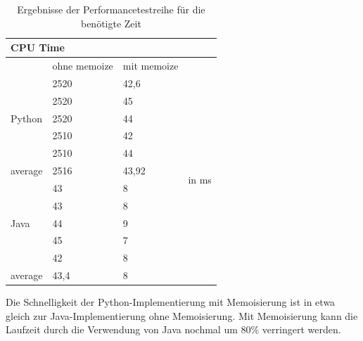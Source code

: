 \begin{table}[H]
    \centering
    \begin{tabular}{|l|ll|l|}
        \hline
        \multicolumn{4}{|l|}{\textbf{CPU Time}}                                        \\ \hline
                                & ohne memoize & mit memoize &                         \\ \hline
        \multirow{5}{*}{Python} & 2520         & 42,6        & \multirow{12}{*}{in ms} \\
                                & 2520         & 45          &                         \\
                                & 2520         & 44          &                         \\
                                & 2510         & 42          &                         \\
                                & 2510         & 44          &                         \\ \cline{1-3}
        average                 & 2516         & 43,92       &                         \\ \cline{1-3}
        \multirow{5}{*}{Java}   & 43           & 8           &                         \\
                                & 43           & 8           &                         \\
                                & 44           & 9           &                         \\
                                & 45           & 7           &                         \\
                                & 42           & 8           &                         \\ \cline{1-3}
        average                 & 43,4         & 8           &                         \\ \hline
    \end{tabular}
    \caption{Ergebnisse der Performancetestreihe für die benötigte Zeit}
\end{table}

Die Schnelligkeit der Python-Implementierung mit Memoisierung ist in etwa gleich zur Java-Implementierung 
ohne Memoisierung. Mit Memoisierung kann die Laufzeit durch die Verwendung von Java nochmal um 80\% verringert 
werden.
